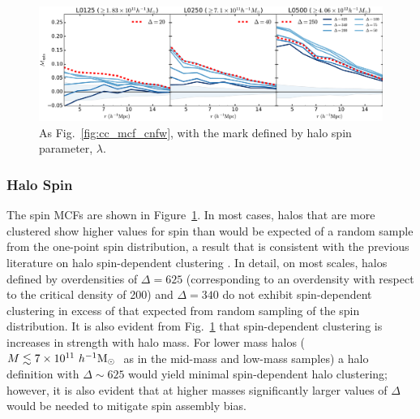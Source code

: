 \documentclass[usenatbib,fleqn]{mnras}
\begin{document}
\begin{figure}
	\centering
	\includegraphics[width=\textwidth]{all_mcf_spin.pdf}
	\caption{
As Fig.~\ref{fig:cc_mcf_cnfw}, with the mark defined by halo spin parameter, $\lambda$.
}
	\label{fig:cc_mcf_spin}
\end{figure}

\subsubsection{Halo Spin}

The spin MCFs are shown in Figure~\ref{fig:cc_mcf_spin}. In most cases, halos that are more clustered show higher values for spin than would be expected of a random sample from the one-point spin distribution, a result that is consistent with the previous literature on halo spin-dependent clustering \citep{bett_etal07,faltenbacher_white10,lacerna_padilla12}. In detail, on most scales, halos defined by overdensities of $\Delta=625$ (corresponding to an overdensity with respect to the critical density of 200) and $\Delta=340$ do not exhibit spin-dependent clustering in excess of that expected from random sampling of the spin distribution. It is also evident from Fig.~\ref{fig:cc_mcf_spin} that spin-dependent clustering is increases in strength with halo mass. For lower mass halos ($M \lesssim 7 \times 10^{11} \ h^{-1}\mathrm{M}_{\odot}~$ as in the mid-mass and low-mass samples) a halo definition with $\Delta \sim 625$ would yield minimal spin-dependent halo clustering; however, it is also evident that at higher masses significantly larger values of $\Delta$ would be needed to mitigate spin assembly bias.  
\end{document}
